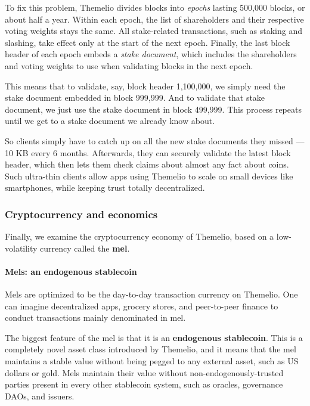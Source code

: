 \documentclass[]{article}
\let\oldparagraph\paragraph
\renewcommand{\paragraph}[1]{\oldparagraph{#1}\mbox{}}
\begin{document}
To fix this problem, Themelio divides blocks into \emph{epochs} lasting
500,000 blocks, or about half a year. Within each epoch, the list of
shareholders and their respective voting weights stays the same. All
stake-related transactions, such as staking and slashing, take effect
only at the start of the next epoch. Finally, the last block header of
each epoch embeds a \emph{stake document}, which includes the
shareholders and voting weights to use when validating blocks in the
next epoch.

This means that to validate, say, block header 1,100,000, we simply need
the stake document embedded in block 999,999. And to validate that stake
document, we just use the stake document in block 499,999. This process
repeats until we get to a stake document we already know about.

So clients simply have to catch up on all the new stake documents they
missed --- 10 KB every 6 months. Afterwards, they can securely validate
the latest block header, which then lets them check claims about almost
any fact about coins. Such ultra-thin clients allow apps using Themelio
to scale on small devices like smartphones, while keeping trust totally
decentralized.

\hypertarget{cryptocurrency-and-economics}{%
\subsubsection{Cryptocurrency and
economics}\label{cryptocurrency-and-economics}}

Finally, we examine the cryptocurrency economy of Themelio, based on a
low-volatility currency called the \textbf{mel}.

\hypertarget{mels-an-endogenous-stablecoin}{%
\paragraph{Mels: an endogenous stablecoin
}\label{mels-an-endogenous-stablecoin}}

Mels are optimized to be the day-to-day transaction currency on
Themelio. One can imagine decentralized apps, grocery stores, and
peer-to-peer finance to conduct transactions mainly denominated in mel.

The biggest feature of the mel is that it is an \textbf{endogenous
stablecoin}. This is a completely novel asset class introduced by
Themelio, and it means that the mel maintains a stable value without
being pegged to any external asset, such as US dollars or gold. Mels
maintain their value without non-endogenously-trusted parties present in
every other stablecoin system, such as oracles, governance DAOs, and
issuers.
\end{document}
